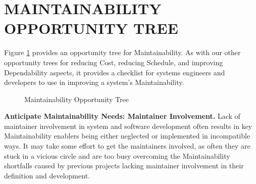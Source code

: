 \section{MAINTAINABILITY OPPORTUNITY TREE}
\label{sec:opportunity_tree}
Figure \ref{fig:opportunity_tree} provides an opportunity tree for Maintainability.   As with our other opportunity trees for reducing Cost, reducing Schedule, and improving Dependability aspects, it provides a checklist for systems engineers and developers to use in improving a system's Maintainability.


\begin{figure}[h]
	\vspace{-0.3cm}
	\centering
	\caption{Maintainability Opportunity Tree}
	\label{fig:opportunity_tree}
\end{figure}



\textbf{Anticipate Maintainability Needs: Maintainer Involvement.}
Lack of maintainer involvement in system and software development often results in key Maintainability enablers being either neglected or implemented in incompatible ways.   It may take some effort to get the maintainers involved, as often they are stuck in a vicious circle and are too busy overcoming the Maintainability shortfalls caused by previous projects lacking maintainer involvement in their definition and development.

